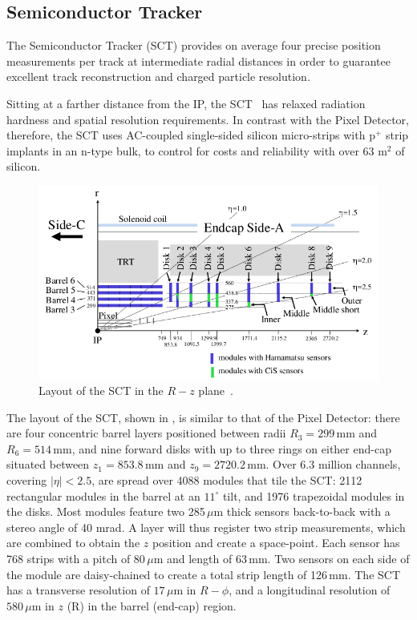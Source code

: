 %
\subsection{Semiconductor Tracker}

The Semiconductor Tracker (SCT) provides on average four precise position measurements per track at intermediate radial distances in order to guarantee excellent track reconstruction and charged particle \pt resolution.

Sitting at a farther distance from the IP, the SCT~\cite{SCT_paper} has relaxed radiation hardness and spatial resolution requirements. In contrast with the Pixel Detector, therefore, the SCT uses AC-coupled single-sided silicon micro-strips with p$^+$ strip implants in an n-type bulk, to control for costs and reliability with over 63 m$^2$ of silicon. 

\begin{figure}[tbp]
\begin{center}
\includegraphics[width=.9\linewidth]{figures/ATLAS/SCT_Quadrant}
\caption[Semiconductor Tracker layout]{Layout of the SCT in the $R-z$ plane~\cite{SCT_paper}.}
\label{fig:sct_layout}
\end{center}
\end{figure}

The layout of the SCT, shown in \Fig{\ref{fig:sct_layout}}, is similar to that of the Pixel Detector: there are four concentric barrel layers
positioned between radii $R_3=299$\,mm and $R_6=514$\,mm, and nine forward disks with up to three rings on either end-cap situated between $z_1=853.8$\,mm and $z_9=2720.2$\,mm. Over 6.3 million channels, covering $|\eta|<2.5$, are spread over 4088 modules that tile the SCT: 2112 rectangular modules in the barrel at an $11^{\circ}$ tilt, and 1976 trapezoidal modules in the disks. Most modules feature two 285\,$\mu$m thick sensors back-to-back with a stereo angle of 40 mrad. A layer will thus register two strip measurements, which are combined to obtain the $z$ position and create a space-point. Each sensor has 768 strips with a pitch of 80\,$\mu$m
and length of 63\,mm. Two sensors on each side of the module are daisy-chained to create a total strip length of 126\,mm.  The SCT has a transverse resolution of $17\,\mu$m in $R-\phi$, and a longitudinal resolution of $580\,\mu$m in $z$ (R) in the barrel (end-cap) region.



